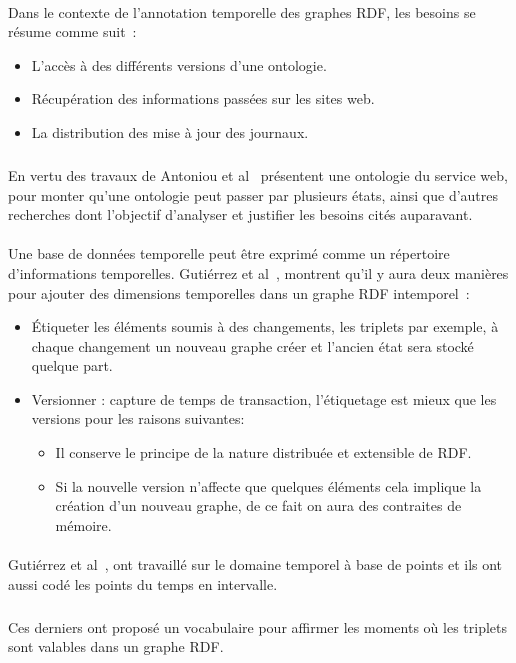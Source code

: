 \documentclass[12pt,a4	]{report}
\begin{document}
\paragraph{}
Dans le contexte de l'annotation temporelle des graphes RDF, les besoins se résume comme suit~:
\begin{itemize}
\item L'accès à des différents versions d’une ontologie.
\item Récupération des informations passées sur les sites web.
\item La distribution des mise à jour des journaux.
\end{itemize}
\subparagraph{}
En vertu des travaux de Antoniou et al~\cite{antoniou2004} présentent une ontologie du service web, pour monter qu'une ontologie peut passer par plusieurs états, ainsi que d'autres recherches dont l'objectif d'analyser et justifier les besoins cités auparavant.
\paragraph{}
Une base de données temporelle peut être exprimé comme un répertoire d'informations temporelles.
Gutiérrez et al~\cite{gutierrez2007}, montrent qu'il y aura deux manières pour ajouter des dimensions temporelles dans un graphe RDF intemporel~:
\begin{itemize}
\item Étiqueter les éléments soumis à des changements, les triplets par exemple, à chaque changement un nouveau graphe créer et l’ancien état sera stocké quelque part.
\item Versionner : capture de temps de transaction, l’étiquetage est mieux que les versions pour les raisons suivantes: 
 \begin{itemize}
\item Il conserve le principe de la nature distribuée et extensible de RDF.
\item Si la nouvelle version n’affecte que quelques éléments cela implique la création d’un nouveau graphe, de ce fait on aura des contraites de mémoire.
\end{itemize}
\end{itemize}
\paragraph{}
Gutiérrez et al~\cite{gutierrez2007}, ont travaillé sur le domaine temporel à base de points et ils ont aussi codé les points du temps en intervalle.
\subparagraph{}
Ces derniers ont proposé un vocabulaire pour affirmer les moments où les triplets sont valables dans un graphe RDF.
\end{document}

